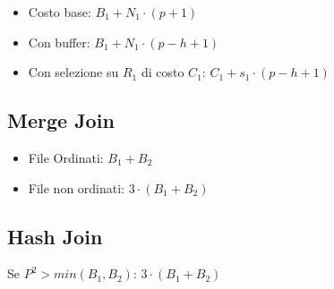 \documentclass[a4paper, 11pt]{article}
\begin{document}
\begin{itemize}
    \item Costo base: $B_1+N_1\cdot(p+1)$
    \item Con buffer: $B_1+N_1\cdot(p-h+1)$
    \item Con selezione su $R_1$ di costo $C_1$: $C_1+s_1\cdot(p-h+1)$
\end{itemize}

\subsection{Merge Join}
\begin{itemize}
    \item File Ordinati: $B_1+B_2$
    \item File non ordinati: $3\cdot (B_1+B_2)$
\end{itemize}

\subsection{Hash Join}
Se $P^2 > min(B_1, B_2)$: $3\cdot (B_1+B_2)$
\end{document}
